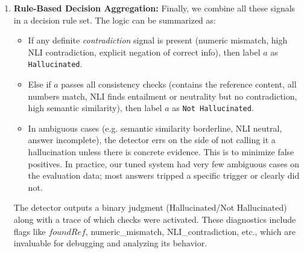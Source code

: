 \documentclass{article}
\begin{document}
\begin{enumerate}
    Conversely, if the model itself outputs an explicit admission of not knowing (like "I don't know the answer"), we do \emph{not} count that as a hallucination under our policy, since it isn’t asserting a falsehood. It's essentially an abstention by the model. In our dataset, however, we observed very few cases of the models outright refusing or saying "I don't know" for the prompted questions; they almost always attempted an answer, even if wrong. Still, the detector is configured such that an answer consisting of an “I don’t know” style response is automatically labeled as not hallucinated (and not correct either, but essentially it's a safe failure).
    
    \item \textbf{Rule-Based Decision Aggregation:} Finally, we combine all these signals in a decision rule set. The logic can be summarized as:
    \begin{itemize}
        \item If any definite \emph{contradiction} signal is present (numeric mismatch, high NLI contradiction, explicit negation of correct info), then label $a$ as \texttt{Hallucinated}.
        \item Else if $a$ passes all consistency checks (contains the reference content, all numbers match, NLI finds entailment or neutrality but no contradiction, high semantic similarity), then label $a$ as \texttt{Not Hallucinated}.
        \item In ambiguous cases (e.g. semantic similarity borderline, NLI neutral, answer incomplete), the detector errs on the side of not calling it a hallucination unless there is concrete evidence. This is to minimize false positives. In practice, our tuned system had very few ambiguous cases on the evaluation data; most answers tripped a specific trigger or clearly did not.
    \end{itemize}
    The detector outputs a binary judgment (Hallucinated/Not Hallucinated) along with a trace of which checks were activated. These diagnostics include flags like $\mathit{foundRef}$, numeric\_mismatch, NLI\_contradiction, etc., which are invaluable for debugging and analyzing its behavior.
\end{enumerate}
\end{document}
